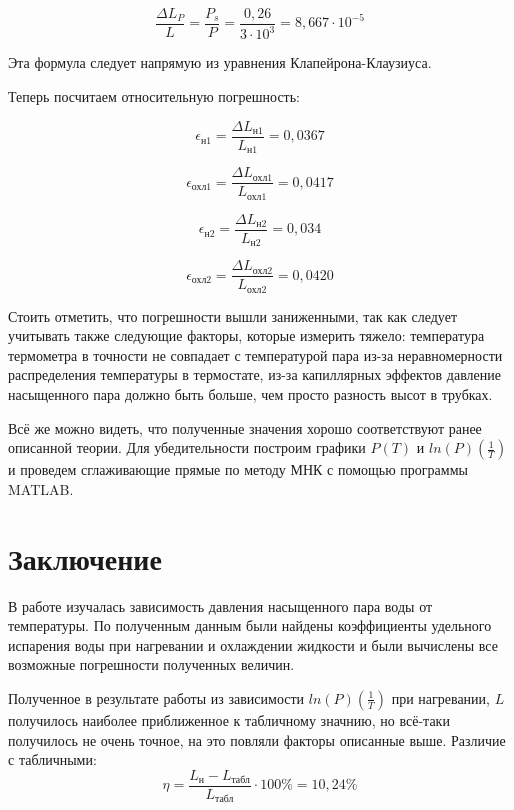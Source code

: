 \begin{equation}
	\frac{\Delta L_P  }{L} = \frac{P_s}{P} = \frac{0,26}{3 \cdot 10^3} = 8,667 \cdot 10^{-5}
\end{equation}

Эта формула следует напрямую из уравнения Клапейрона-Клаузиуса.

Теперь посчитаем относительную погрешность:

\begin{equation}
	\epsilon_{\text{н1}} = \frac{\Delta L_{\text{н1}}}{L_{\text{н1}}} = 0,0367
\end{equation}

\begin{equation}
	\epsilon_{\text{охл1}} = \frac{\Delta L_{\text{охл1}}}{L_{\text{охл1}}} = 0,0417
\end{equation}

\begin{equation}
	\epsilon_{\text{н2}} = \frac{\Delta L_{\text{н2}}}{L_{\text{н2}}} = 0,034
\end{equation}

\begin{equation}
	\epsilon_{\text{охл2}} = \frac{\Delta L_{\text{охл2}}}{L_{\text{охл2}}} = 0,0420
\end{equation}


Стоить отметить, что погрешности вышли заниженными, так как следует учитывать также следующие факторы, которые измерить тяжело: температура термометра в точности не совпадает с температурой пара из-за неравномерности распределения температуры в термостате, из-за капиллярных эффектов давление насыщенного пара должно быть больше, чем просто разность высот в трубках.

Всё же можно видеть, что полученные значения хорошо соответствуют ранее описанной теории. Для убедительности построим графики $P(T)$ и $ln(P)\left( \frac{1}{T}\right)$ и проведем сглаживающие прямые по методу МНК с помощью программы MATLAB.


\section{Заключение}

В работе изучалась зависимость давления насыщенного пара воды от температуры. По полученным данным были найдены коэффициенты удельного испарения воды при нагревании и охлаждении жидкости и были вычислены все возможные погрешности полученных величин.


Полученное в результате работы из зависимости $ln(P)\left(\frac{1}{T}\right)$ при нагревании, $L$ получилось наиболее приближенное к табличному значнию, но всё-таки  получилось не очень точное, на это повляли факторы описанные выше. Различие с табличными:
\begin{equation}
	\eta = \frac{L_\text{н} - L_\text{табл}}{L_\text{табл}}\cdot 100\% = 10,24 \% 
\end{equation}

